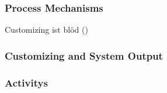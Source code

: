 \subsubsection{Process Mechanisms}

Customizing ist blöd (\cite{Chou.2008})

\subsubsection{Customizing and System Output}

\subsubsection{Activitys}

